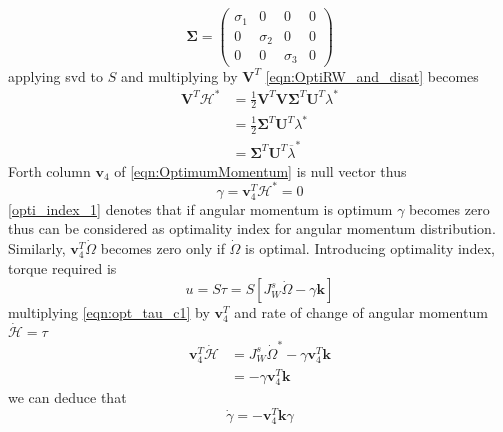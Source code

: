 \begin{equation}
\mathbf{\Sigma } =\begin{pmatrix}
\sigma _{1} & 0 & 0 & 0\\
0 & \sigma _{2} & 0 & 0\\
0 & 0 & \sigma _{3} & 0
\end{pmatrix}
\end{equation}
applying \acrshort{svd} to $\displaystyle S$ and multiplying by $\displaystyle \mathbf{V}^{T}$ \autoref{eqn:OptiRW_and_disat} becomes
\begin{equation}
\begin{aligned}
\mathbf{V}^{T}\mathcal{H}^{*} & =\frac{1}{2}\mathbf{V}^{T}\mathbf{V\Sigma }^{T}\mathbf{U}^{T} \lambda ^{*}\\
 & =\frac{1}{2}\mathbf{\Sigma }^{T}\mathbf{U}^{T} \lambda ^{*}\\
 & =\mathbf{\Sigma }^{T}\mathbf{U}^{T}\overline{\lambda }^{*}
\end{aligned}
\end{equation}
Forth column $\displaystyle \mathbf{v}_{4}$ of \autoref{eqn:OptimumMomentum}  is null vector thus
\begin{equation}
\gamma =\mathbf{v}^{T}_{4}\mathcal{H}^{*} =0
\label{opti_index_1}
\end{equation}
\autoref{opti_index_1} denotes that if angular momentum is optimum $\displaystyle \gamma $ becomes zero thus can be considered as optimality index for angular momentum distribution. Similarly, $\displaystyle \mathbf{v}^{T}_{4}\dot{\Omega }$ becomes zero only if $\displaystyle \dot{\Omega }$ is optimal. Introducing optimality index, torque required is
\begin{equation}
u =S\tau =S\left[ J^{s}_{W}\dot{\Omega } -\gamma \mathbf{k}\right]
\label{eqn:opt_tau_c1}
\end{equation}
multiplying \autoref{eqn:opt_tau_c1} by $\displaystyle \mathbf{v}^{T}_{4}$ and rate of change of angular momentum $\displaystyle \dot{\mathcal{H}} =\tau $
\begin{equation*}
\begin{aligned}
\mathbf{v}^{T}_{4}\dot{\mathcal{H}} & =J^{s}_{W}\dot{\Omega }^{*} -\gamma \mathbf{v}^{T}_{4}\mathbf{k}\\
 & =-\gamma \mathbf{v}^{T}_{4}\mathbf{k}
\end{aligned}
\end{equation*}
we can deduce that
\begin{equation}
\dot{\gamma } =-\mathbf{v}^{T}_{4}\mathbf{k} \gamma 
\end{equation}
